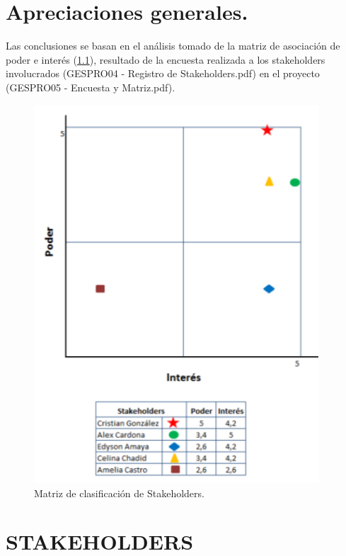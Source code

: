 \chapter{Apreciaciones generales.}
%
Las conclusiones se basan en el an\'alisis tomado de la matriz de asociaci\'on de poder e inter\'es 
(\ref{matrizstakeholders}), resultado de la encuesta realizada a los stakeholders involucrados (GESPRO04 - Registro 
de Stakeholders.pdf) en el proyecto (GESPRO05 - Encuesta y Matriz.pdf).\\
%
\begin{figure}[H]
    \centering
    \includegraphics[width=0.95\textwidth]{images/matrizstakeholders.png}
    \caption{Matriz de clasificaci\'on de Stakeholders.}
    \label{matrizstakeholders}
\end{figure}
%
\chapter{STAKEHOLDERS}
%
